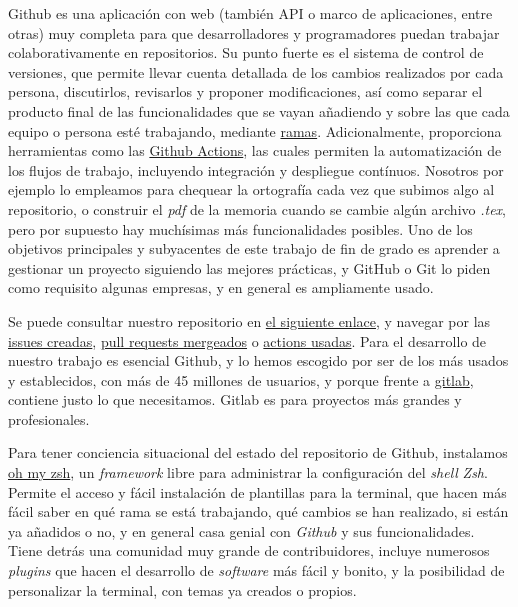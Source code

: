 Github es una aplicación con web (también API o marco de aplicaciones, entre otras) muy completa 
para que desarrolladores y programadores puedan trabajar colaborativamente 
en repositorios. Su punto fuerte es el sistema de control de versiones, que permite llevar 
cuenta detallada de los cambios realizados por cada persona, discutirlos, revisarlos y proponer 
modificaciones, así como 
separar el producto final de las funcionalidades que se vayan añadiendo y sobre las que cada equipo o persona 
esté trabajando, mediante \href{https://docs.github.com/pull-requests/collaborating-with-pull-requests/proposing-changes-to-your-work-with-pull-requests/about-branches}{ramas}. 
Adicionalmente, proporciona herramientas como las \href{https://github.com/features/actions}{Github Actions}, 
las cuales permiten la automatización de los flujos de trabajo, incluyendo integración y despliegue contínuos.
Nosotros por ejemplo lo empleamos para chequear la ortografía cada vez que subimos algo al repositorio, o construir el \textit{pdf}
de la memoria cuando se cambie algún archivo \textit{.tex}, pero por supuesto hay muchísimas más funcionalidades posibles.
Uno de los objetivos principales y subyacentes de este trabajo de fin de grado es aprender a gestionar un proyecto 
siguiendo las mejores prácticas, y GitHub o Git lo piden como requisito algunas empresas, y en general es ampliamente 
usado.

Se puede consultar nuestro repositorio en \href{https://github.com/ElenaMerelo/TFG}{el siguiente enlace}, y navegar 
por las \href{https://github.com/ElenaMerelo/TFG/issues}{issues creadas}, \href{https://github.com/ElenaMerelo/TFG/pulls}{pull requests mergeados} 
o \href{https://github.com/ElenaMerelo/TFG/actions}{actions usadas}. Para el desarrollo de nuestro trabajo es esencial 
Github, y lo hemos escogido por ser de los más usados y establecidos, con más de 45 millones de usuarios, 
y porque frente a \href{https://about.gitlab.com/}{gitlab}, contiene justo lo que necesitamos. Gitlab es para proyectos 
más grandes y profesionales.

Para tener conciencia situacional del estado del repositorio de Github, instalamos \href{https://ohmyz.sh/}{oh my zsh}, 
un \textit{framework} libre para administrar la configuración del \textit{shell} \textit{Zsh}. Permite el 
acceso y fácil instalación de plantillas para la terminal, que hacen más fácil saber en qué rama se está 
trabajando, qué cambios se han realizado, si están ya añadidos o no, y en general casa genial con 
\textit{Github} y sus funcionalidades. Tiene detrás una comunidad muy grande de 
contribuidores, incluye numerosos \textit{plugins} que hacen el desarrollo de \textit{software} más fácil y bonito, 
y la posibilidad de personalizar la terminal, con temas ya creados o propios.


